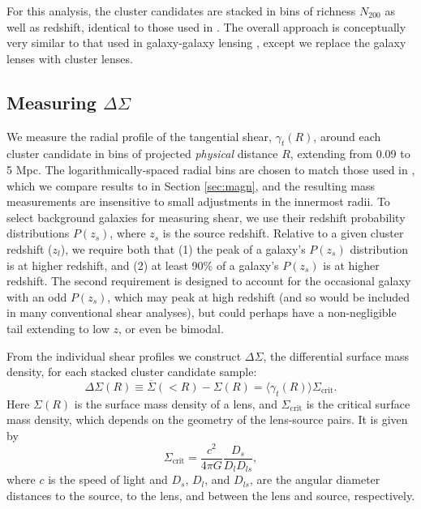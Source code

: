 For this analysis, the cluster candidates are stacked in bins of richness $N_{200}$ as well as redshift, identical to those used in \citet{Ford14}. The overall approach is conceptually very similar to that used in galaxy-galaxy lensing \citep[see][]{Velander14}, except we replace the galaxy lenses with cluster lenses.


\subsection{Measuring $\Delta\Sigma$}
\label{sec:measure}

We measure the radial profile of the tangential shear, $\gamma_t(R)$, around each cluster candidate in bins of projected {\it physical} distance $R$, extending from 0.09 to 5 Mpc. The logarithmically-spaced radial bins are chosen to match those used in \citet{Ford14}, which we compare results to in Section \ref{sec:magn}, and the resulting mass measurements are insensitive to small adjustments in the innermost radii. To select background galaxies for measuring shear, we use their redshift probability distributions $P(z_s)$, where $z_s$ is the source redshift. Relative to a given cluster redshift ($z_l$), we require both that (1) the peak of a galaxy's $P(z_s)$ distribution is at higher redshift, and (2) at least 90\% of a galaxy's $P(z_s)$ is at higher redshift. The second requirement is designed to account for the occasional galaxy with an odd $P(z_s)$, which may peak at high redshift (and so would be included in many conventional shear analyses), but could perhaps have a non-negligible tail extending to low $z$, or even be bimodal.

From the individual shear profiles we construct $\Delta\Sigma$, the differential surface mass density, for each stacked cluster candidate sample: 
\begin{equation}
\label{eqn:deltasig}
\Delta\Sigma(R) \equiv \overline{\Sigma}(<R)-\Sigma(R) = \langle \gamma_t(R) \rangle \Sigma_{\mathrm{crit}}.
\end{equation}
Here $\Sigma(R)$ is the surface mass density of a lens, and $\Sigma_{\mathrm{crit}}$ is the critical surface mass density, which depends on the geometry of the lens-source pairs. It is given by
\begin{equation}
\label{eqn:sigcrit}
\Sigma_{\mathrm{crit}} = \frac{c^2}{4 \pi G} \frac{D_s}{D_l D_{ls}},
\end{equation}
where $c$ is the speed of light and $D_s$, $D_l$, and $D_{ls}$, are the angular diameter distances to the source, to the lens, and between the lens and source, respectively. 

